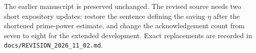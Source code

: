 \ifDetailed The earlier manuscript is preserved unchanged. The revised source needs two short expository updates: restore the sentence defining the saving $\eta$ after the shortened prime-power estimate, and change the acknowledgement count from seven to eight for the extended development. Exact replacements are recorded in \texttt{docs/REVISION\_2026\_11\_02.md}.\fi
